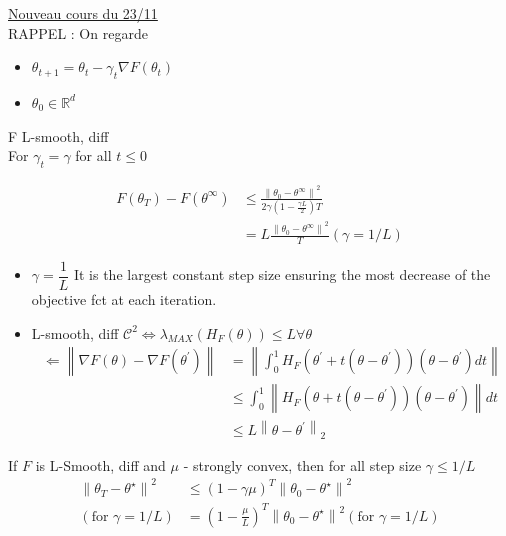 \underline{Nouveau cours du 23/11} \\


RAPPEL : 
On regarde \begin{itemize}
    \item $ \theta _{t+1} = \theta _t - \gamma _t \nabla F(\theta _t)$ 
    \item $ \theta _0 \in \mathbb{R}^d $ 
\end{itemize}

\begin{thm}[]
    F L-smooth, diff \\
    For $\gamma_t = \gamma$ for all $t \leq0$
    
    \begin{align*}
        F(\theta _T) - F(\theta ^\infty ) 
            &\leq \frac{\left\| \theta _0 - \theta ^\infty \right\| ^2}{2 \gamma (1 - \frac{\gamma L}{2} )T} \\
            &= L \frac{\left\| \theta _0 - \theta ^\infty  \right\| ^2 }{T} (\gamma = 1/L)
    \end{align*}


    \begin{itemize}
        \item $\gamma = \dfrac{1}{L}$ It is the largest constant step size ensuring the most decrease of the objective fct at each iteration.
        \item L-smooth, diff $\mathcal{C}^2 \Leftrightarrow \lambda_{MAX}(H_F(\theta)) \leq L \forall \theta $
        \begin{align*}
            \Leftarrow  \left\| \nabla F(\theta ) - \nabla F(\theta ^\prime ) \right\|  
                &= \left\| \int_{0}^{1} H_F (\theta ^\prime + t ( \theta  - \theta ^\prime )) (\theta  - \theta ^\prime ) dt \right\| \\
                &\leq \int_{0}^{1} \left\| H_F (\theta  + t (\theta  - \theta ^\prime )) (\theta  - \theta ^\prime ) \right\| dt \\
                &\leq L \left\| \theta - \theta ^\prime  \right\| _2
        \end{align*}
    \end{itemize}
\end{thm}

\begin{thm}[]
    If $ F $ is L-Smooth, diff and $ \mu  $ - strongly convex, then for all step size $ \gamma \leq 1/L $ 
    \begin{align*}
        \left\| \theta _T - \theta ^\star  \right\| ^2 
            &\leq (1 - \gamma \mu ) ^T \left\| \theta _0 - \theta ^\star  \right\| ^2 \\
            (\text{for } \gamma = 1/L) &= (1 - \frac{\mu }{L}) ^T \left\| \theta _0 - \theta ^\star  \right\| ^2 (\text{for } \gamma = 1/L)
    \end{align*}
\end{thm}

